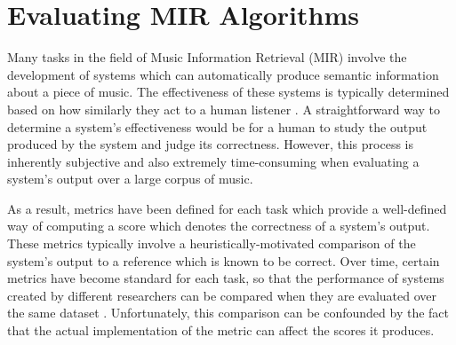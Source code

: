 \documentclass{article}
\title{\mireval{}}
\def\mireval{\texttt{mir\char`_eval}}
\begin{document}
%
\maketitle
%
\begin{abstract}
Central to the field of MIR research is the evaluation of algorithms used to extract information from music data.
We present \mireval{}, an open source software library which provides a transparent and easy-to-use implementation of the most common metrics used to measure the performance of MIR algorithms.
In the present work, we enumerate the metrics implemented by \mireval{} and quantitatively compare each to an existing implementation.
When the score reported by \mireval{} differs substantially from the reference, we detail the differences in implementation.
We also provide a brief overview of \mireval{}'s architecture, design, and intended use.
\end{abstract}
%
\section{Evaluating MIR Algorithms}

Many tasks in the field of Music Information Retrieval (MIR) involve the development of systems which can automatically produce semantic information about a piece of music.
The effectiveness of these systems is typically determined based on how similarly they act to a human listener \cite{downie2003toward}.
A straightforward way to determine a system's effectiveness would be for a human to study the output produced by the system and judge its correctness.
However, this process is inherently subjective and also extremely time-consuming when evaluating a system's output over a large corpus of music.

As a result, metrics have been defined for each task which provide a well-defined way of computing a score which denotes the correctness of a system's output.
These metrics typically involve a heuristically-motivated comparison of the system's output to a reference which is known to be correct.
Over time, certain metrics have become standard for each task, so that the performance of systems created by different researchers can be compared when they are evaluated over the same dataset \cite{downie2003toward}.
Unfortunately, this comparison can be confounded by the fact that the actual implementation of the metric can affect the scores it produces.
\end{document}

